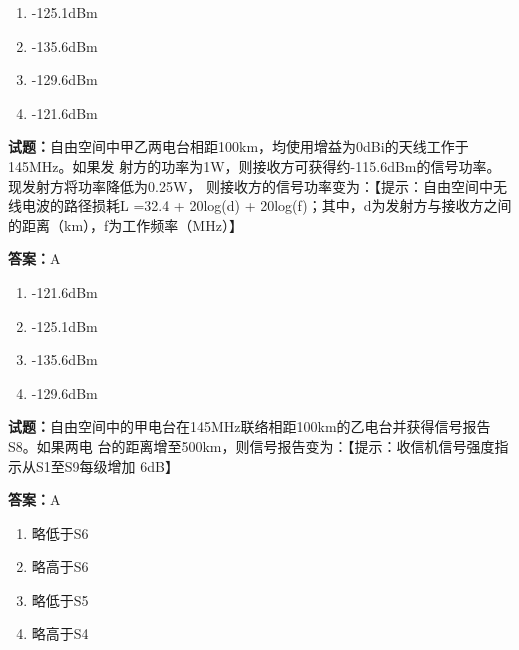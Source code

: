 \documentclass{ctexbook}
\begin{document}
\begin{enumerate}[leftmargin=3em]
  \item -125.1dBm 

  \item -135.6dBm 

  \item -129.6dBm 

  \item -121.6dBm 

\end{enumerate}





\vspace{1em}

\textbf{试题：}自由空间中甲乙两电台相距100km，均使用增益为0dBi的天线工作于145MHz。如果发
射方的功率为1W，则接收方可获得约-115.6dBm的信号功率。现发射方将功率降低为0.25W，
则接收方的信号功率变为：【提示：自由空间中无线电波的路径损耗L =32.4 + 20log(d) + 
20log(f)；其中，d为发射方与接收方之间的距离（km），f为工作频率（MHz）】 

\textbf{答案：}A 

\begin{enumerate}[leftmargin=3em]
  \item -121.6dBm 

  \item -125.1dBm 

  \item -135.6dBm 

  \item -129.6dBm 

\end{enumerate}





\vspace{1em}

\textbf{试题：}自由空间中的甲电台在145MHz联络相距100km的乙电台并获得信号报告S8。如果两电
台的距离增至500km，则信号报告变为：【提示：收信机信号强度指示从S1至S9每级增加
6dB】 

\textbf{答案：}A 

\begin{enumerate}[leftmargin=3em]
  \item 略低于S6 


  \item 略高于S6 

  \item 略低于S5 

  \item 略高于S4 

\end{enumerate}
\end{document}
